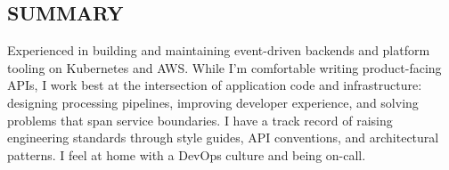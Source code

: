 \documentclass[line,margin]{res}
\begin{document}
\address{}
\address{\href{mailto://simon.r.crowe@protonmail.com}{simon.r.crowe@protonmail.com}}

\begin{resume}

\section{SUMMARY} Experienced in building and maintaining event-driven backends and platform tooling
                  on Kubernetes and AWS. While I'm comfortable writing product-facing APIs,
                  I work best at the intersection of application code and infrastructure:
                  designing processing pipelines, improving developer experience, and solving problems that
                  span service boundaries. I have a track record of raising engineering standards
                  through style guides, API conventions, and architectural patterns.
                  I feel at home with a DevOps culture and being on-call.


\end{resume}
\end{document}
